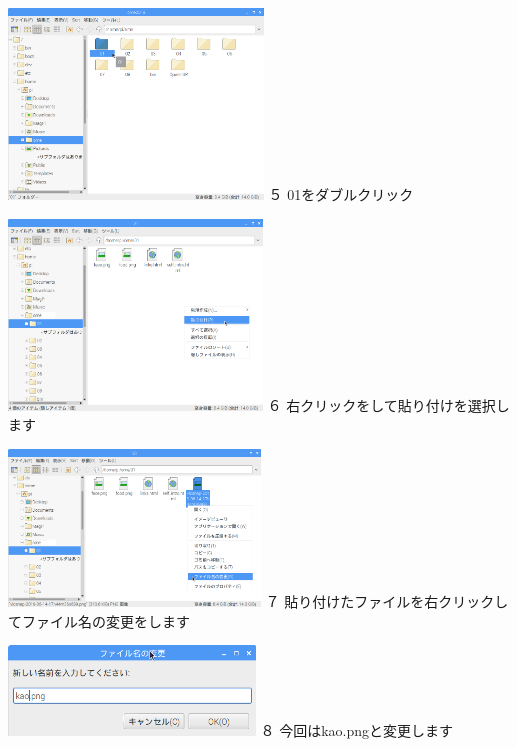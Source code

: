 \documentclass[a4paper,12pt]{jarticle}
\begin{document}
\centering
\begin{minipage}[b]{6.8cm}
\includegraphics[width=6.77cm,height=5.092cm]{textbook-img167.png}
	\newline
５ 01をダブルクリック
\end{minipage}
\hspace{10mm}
\begin{minipage}[b]{7.559cm}
\includegraphics[width=6.743cm,height=5.073cm]{textbook-img168.png}
	\newline
６
右クリックをして貼り付けを選択します
\end{minipage}


\bigskip


\begin{minipage}[b]{6.878cm}
\includegraphics[width=6.692cm,height=4.186cm]{textbook-img169.png}
	\newline
７
貼り付けたファイルを右クリックしてファイル名の変更をします
\end{minipage}
\hspace{10mm}
\begin{minipage}[b]{6.846cm}
\includegraphics[width=6.558cm,height=2.408cm]{textbook-img166.png}
８ 今回はkao.pngと変更します
\newline
\end{minipage}
\end{document}

